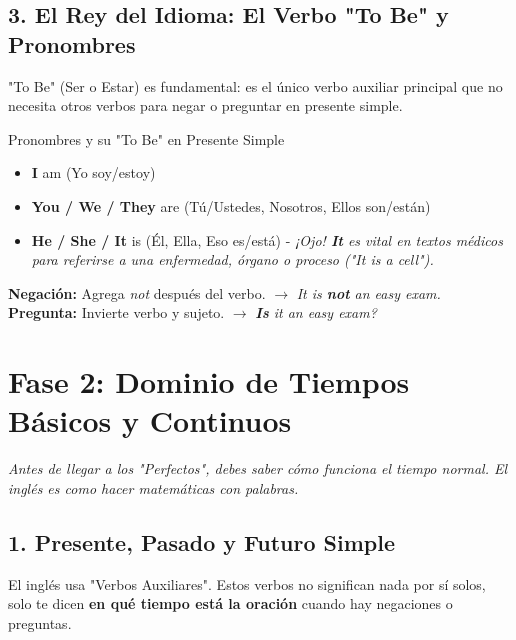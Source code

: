 \documentclass[11pt,a4paper]{article}
\begin{document}
\subsection{3. El Rey del Idioma: El Verbo "To Be" y Pronombres}
"To Be" (Ser o Estar) es fundamental: es el único verbo auxiliar principal que no necesita otros verbos para negar o preguntar en presente simple.

\begin{hackbox}{Pronombres y su "To Be" en Presente Simple}
    \begin{itemize}[noitemsep]
        \item \textbf{I} am (Yo soy/estoy)
        \item \textbf{You / We / They} are (Tú/Ustedes, Nosotros, Ellos son/están)
        \item \textbf{He / She / It} is (Él, Ella, Eso es/está) - \textit{¡Ojo! \textbf{It} es vital en textos médicos para referirse a una enfermedad, órgano o proceso ("It is a cell").}
    \end{itemize}
    \textbf{Negación:} Agrega \textit{not} después del verbo. $\to$ \textit{It is \textbf{not} an easy exam.} \\
    \textbf{Pregunta:} Invierte verbo y sujeto. $\to$ \textit{\textbf{Is} it an easy exam?}
\end{hackbox}

\vspace{0.4cm}

\section{Fase 2: Dominio de Tiempos Básicos y Continuos}
\textit{Antes de llegar a los "Perfectos", debes saber cómo funciona el tiempo normal. El inglés es como hacer matemáticas con palabras.}

\subsection{1. Presente, Pasado y Futuro Simple}
El inglés usa "Verbos Auxiliares". Estos verbos no significan nada por sí solos, solo te dicen \textbf{en qué tiempo está la oración} cuando hay negaciones o preguntas.
\end{document}
